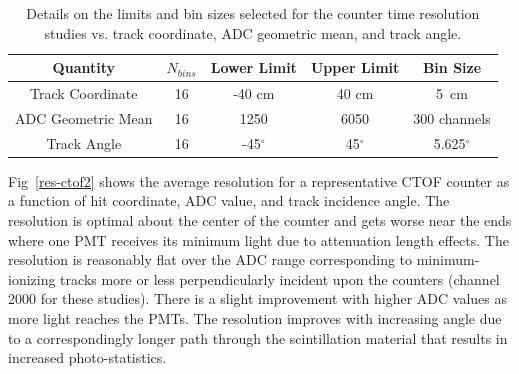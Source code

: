 \documentclass{elsart}
\begin{document}
\begin{table}[htpb]
\begin{center}
\begin{tabular} {|c|c|c|c|c|} \hline
Quantity           & $N_{bins}$ & Lower Limit & Upper Limit & Bin Size \\ \hline
Track Coordinate   & 16 & -40 cm      & 40 cm      & 5~cm \\ \hline
ADC Geometric Mean & 16 & 1250        & 6050       & 300 channels \\ \hline
Track Angle        & 16 & -45$^\circ$ & 45$^\circ$ & 5.625$^\circ$ \\ \hline
\end{tabular}
\end{center}
\caption{Details on the limits and bin sizes selected for the counter time resolution studies vs.
track coordinate, ADC geometric mean, and track angle.}
\label{res-studies}
\end{table}

Fig~\ref{res-ctof2} shows the average resolution for a representative CTOF counter as a function
of hit coordinate, ADC value, and track incidence angle. The resolution is optimal about the center of
the counter and gets worse near the ends where one PMT receives its minimum light due to attenuation
length effects. The resolution is reasonably flat over the ADC range corresponding to minimum-ionizing
tracks more or less perpendicularly incident upon the counters (channel 2000 for these studies). There
is a slight improvement with higher ADC values as more light reaches the PMTs. The resolution improves
with increasing angle due to a correspondingly longer path through the scintillation material that results in
increased photo-statistics.
\end{document}

